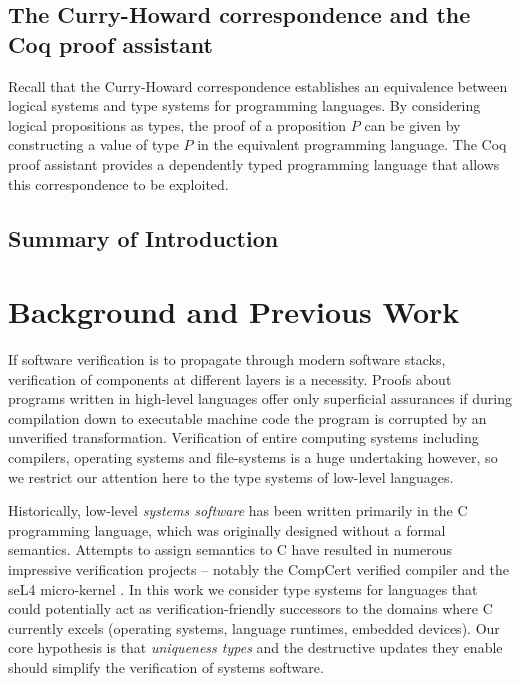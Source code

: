 \documentclass[]{unswthesis}
\begin{document}
\section{The Curry-Howard correspondence and the Coq proof assistant}
\label{sec:curry_howard}

Recall that the Curry-Howard correspondence establishes an equivalence between logical systems and type systems for programming languages. By considering logical propositions as types, the proof of a proposition $P$ can be given by constructing a value of type $P$ in the equivalent programming language. The Coq proof assistant provides a dependently typed programming language that allows this correspondence to be exploited.

\section{Summary of Introduction}

\chapter{Background and Previous Work}
\label{ch:background}

If software verification is to propagate through modern software stacks, verification of components at different layers is a necessity. Proofs about programs written in high-level languages offer only superficial assurances if during compilation down to executable machine code the program is corrupted by an unverified transformation. Verification of entire computing systems including compilers, operating systems and file-systems is a huge undertaking however, so we restrict our attention here to the type systems of low-level languages.

Historically, low-level \textit{systems software} has been written primarily in the C programming language, which was originally designed without a formal semantics. Attempts to assign semantics to C have resulted in numerous impressive verification projects -- notably the CompCert verified compiler \cite{leroy09} and the seL4 micro-kernel \cite{klein14}. In this work we consider type systems for languages that could potentially act as verification-friendly successors to the domains where C currently excels (operating systems, language runtimes, embedded devices). Our core hypothesis is that \textit{uniqueness types} and the destructive updates they enable should simplify the verification of systems software.
\end{document}
